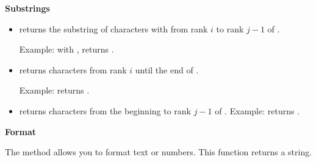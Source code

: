 \documentclass[11pt,class=report,crop=false]{standalone}
\begin{document}
\bigskip

\textbf{Substrings}

\begin{itemize}
  \item {}\quad returns the substring of characters with from rank $i$ to rank $j-1$ of .
  
   Example: with ,  returns .
   
  \item {}\quad returns characters from rank $i$ until the end of . 
  
  Example:
   returns .
  
  \item{}\quad returns characters from the beginning to rank $j-1$ of . Example:  returns .
  
\end{itemize}


\bigskip
\textbf{Format}

The  method allows you to format text or numbers. This function returns a string.
\end{document}
